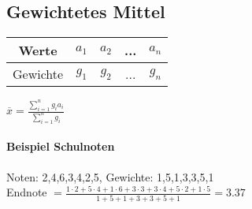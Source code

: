 \subsection{Gewichtetes Mittel}
\begin{tabular}{|c|c|c|c|c|}
\hline Werte & $ a_1 $ & $ a_2 $ & ... & $ a_n $ \\ 
\hline Gewichte & $ g_1 $ & $ g_2 $ & ... & $ g_n $ \\ 
\hline 
\end{tabular} 
$ \overline{x} = \frac{\sum_{i=1}^{n}g_i a_i}{\sum_{i=1}^{n} g_i} $

\paragraph{Beispiel Schulnoten}
Noten: 2,4,6,3,4,2,5, Gewichte: 1,5,1,3,3,5,1\\
Endnote $= \frac{1\cdot 2+ 5\cdot 4 + 1\cdot 6+ 3\cdot 3 + 3\cdot 4+ 5\cdot 2 + 1\cdot 5}{1+5+1+3+3+5+1} = 3.37 $

